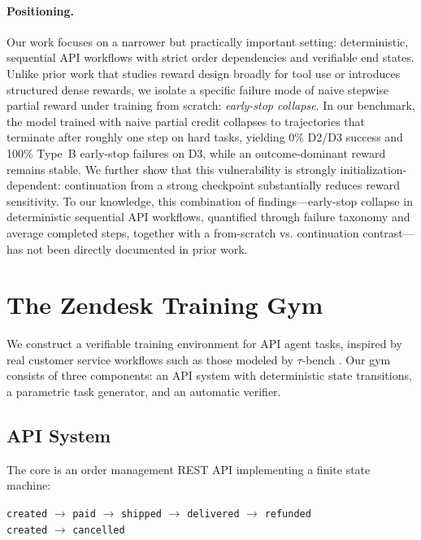 \documentclass[11pt]{article}
\begin{document}
\paragraph{Positioning.}
Our work focuses on a narrower but practically important setting: deterministic, sequential API workflows with strict order dependencies and verifiable end states.
Unlike prior work that studies reward design broadly for tool use or introduces structured dense rewards, we isolate a specific failure mode of naive stepwise partial reward under training from scratch: \emph{early-stop collapse}.
In our benchmark, the model trained with naive partial credit collapses to trajectories that terminate after roughly one step on hard tasks, yielding 0\% D2/D3 success and 100\% Type~B early-stop failures on D3, while an outcome-dominant reward remains stable.
We further show that this vulnerability is strongly initialization-dependent: continuation from a strong checkpoint substantially reduces reward sensitivity.
To our knowledge, this combination of findings---early-stop collapse in deterministic sequential API workflows, quantified through failure taxonomy and average completed steps, together with a from-scratch vs. continuation contrast---has not been directly documented in prior work.


\section{The Zendesk Training Gym}
\label{sec:gym}

We construct a verifiable training environment for API agent tasks, inspired by real customer service workflows such as those modeled by $\tau$-bench \citep{yao2024taubench}. Our gym consists of three components: an API system with deterministic state transitions, a parametric task generator, and an automatic verifier.

\subsection{API System}

The core is an order management REST API implementing a finite state machine:
\begin{center}
\texttt{created} $\to$ \texttt{paid} $\to$ \texttt{shipped} $\to$ \texttt{delivered} $\to$ \texttt{refunded}\\[2pt]
\texttt{created} $\to$ \texttt{cancelled}
\end{center}
\end{document}
